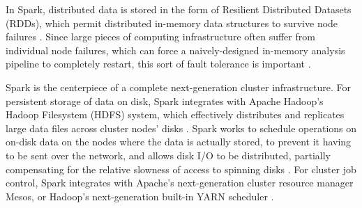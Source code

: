\documentclass[11pt,proposal]{ucthesis}
\begin{document}
In Spark, distributed data is stored in the form of Resilient Distributed Datasets (RDDs), which permit distributed in-memory data structures to survive node failures \cite{zaharia2012resilient}. Since large pieces of computing infrastructure often suffer from individual node failures, which can force a naively-designed in-memory analysis pipeline to completely restart, this sort of fault tolerance is important \cite{thanakornworakij2013reliability}.

Spark is the centerpiece of a complete next-generation cluster infrastructure. For persistent storage of data on disk, Spark integrates with Apache Hadoop's Hadoop Filesystem (HDFS) system, which effectively distributes and replicates large data files across cluster nodes' disks \cite{zaharia2012fast,borthakur2008hdfs}. Spark works to schedule operations on on-disk data on the nodes where the data is actually stored, to prevent it having to be sent over the network, and allows disk I/O to be distributed, partially compensating for the relative slowness of access to spinning disks \cite{borthakur2008hdfs}. For cluster job control, Spark integrates with Apache's next-generation cluster resource manager Mesos, or Hadoop's next-generation built-in YARN scheduler \cite{apache2014cluster}.




    
    
    
    
    
    
        
    
\end{document}
